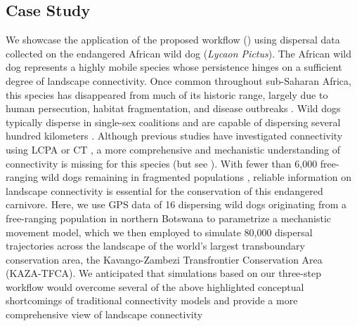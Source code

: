 \documentclass[abstract=on,10pt,a4paper,bibliography=totocnumbered]{article}
\begin{document}
\subsection{Case Study}
We showcase the application of the proposed workflow ()
using dispersal data collected on the endangered African wild dog
(\textit{Lycaon Pictus}). The African wild dog represents a highly mobile
species whose persistence hinges on a sufficient degree of landscape
connectivity. Once common throughout sub-Saharan Africa, this species has
disappeared from much of its historic range, largely due to human persecution,
habitat fragmentation, and disease outbreaks \citep{Woodroffe.2012}. Wild dogs
typically disperse in single-sex coalitions \citep{McNutt.1996, Behr.2020} and
are capable of dispersing several hundred kilometers \citep{DaviesMostert.2012,
Masenga.2016, Cozzi.2020}. Although previous studies have investigated
connectivity using LCPA \citep{Hofmann.2021} or CT \citep{Brennan.2020}, a more
comprehensive and mechanistic understanding of connectivity is missing for this
species (but see \citealp{Creel.2020}). With fewer than 6,000 free-ranging wild
dogs remaining in fragmented populations \citep{Woodroffe.2012}, reliable
information on landscape connectivity is essential for the conservation of this
endangered carnivore. Here, we use GPS data of 16 dispersing wild dogs
originating from a free-ranging population in northern Botswana to parametrize a
mechanistic movement model, which we then employed to simulate 80,000 dispersal
trajectories across the landscape of the world's largest transboundary
conservation area, the Kavango-Zambezi Transfrontier Conservation Area
(KAZA-TFCA). We anticipated that simulations based on our three-step workflow
would overcome several of the above highlighted conceptual shortcomings of
traditional connectivity models and provide a more comprehensive view of
landscape connectivity
\end{document}

